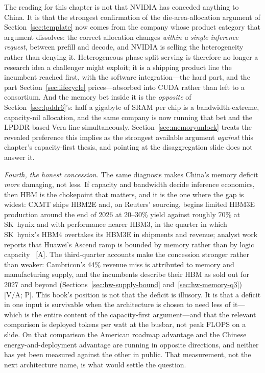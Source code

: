 The reading for this chapter is not that NVIDIA has conceded anything to China. It is that the strongest confirmation of the die-area-allocation argument of Section~\ref{sec:template} now comes from the company whose product category that argument dissolves: the correct allocation changes \emph{within a single inference request}, between prefill and decode, and NVIDIA is selling the heterogeneity rather than denying it. Heterogeneous phase-split serving is therefore no longer a research idea a challenger might exploit; it is a shipping product line the incumbent reached first, with the software integration---the hard part, and the part Section~\ref{sec:lifecycle} prices---absorbed into CUDA rather than left to a consortium. And the memory bet inside it is the \emph{opposite} of Section~\ref{sec:lpddr6}'s: half a gigabyte of SRAM per chip is a bandwidth-extreme, capacity-nil allocation, and the same company is now running that bet and the LPDDR-based Vera line simultaneously. Section~\ref{sec:memoryunlock} treats the revealed preference this implies as the strongest available argument \emph{against} this chapter's capacity-first thesis, and pointing at the disaggregation slide does not answer it.

\emph{Fourth, the honest concession.} The same diagnosis makes China's memory deficit \emph{more} damaging, not less. If capacity and bandwidth decide inference economics, then HBM is the chokepoint that matters, and it is the one where the gap is widest: CXMT ships HBM2E and, on Reuters' sourcing, begins limited HBM3E production around the end of 2026 at 20--30\% yield against roughly 70\% at SK~hynix and with performance nearer HBM3, in the quarter in which SK~hynix's HBM4 overtakes its HBM3E in shipments and revenue; analyst work reports that Huawei's Ascend ramp is bounded by memory rather than by logic capacity~\cite{hw-cxmt-hbm3e,hw-skhynix-q3,hbm-gap,semianalysis-ascend} [A]. The third-quarter accounts make the concession stronger rather than weaker: Cambricon's 44\% revenue miss is attributed to memory and manufacturing supply, and the incumbents describe their HBM as sold out for 2027 and beyond (Sections~\ref{sec:hw-supply-bound} and~\ref{sec:hw-memory-q3}) [V/A; P]. This book's position is not that the deficit is illusory. It is that a deficit in one input is survivable when the architecture is chosen to need less of it---which is the entire content of the capacity-first argument---and that the relevant comparison is deployed tokens per watt at the busbar, not peak FLOPS on a slide. On that comparison the American roadmap advantage and the Chinese energy-and-deployment advantage are running in opposite directions, and neither has yet been measured against the other in public. That measurement, not the next architecture name, is what would settle the question.

